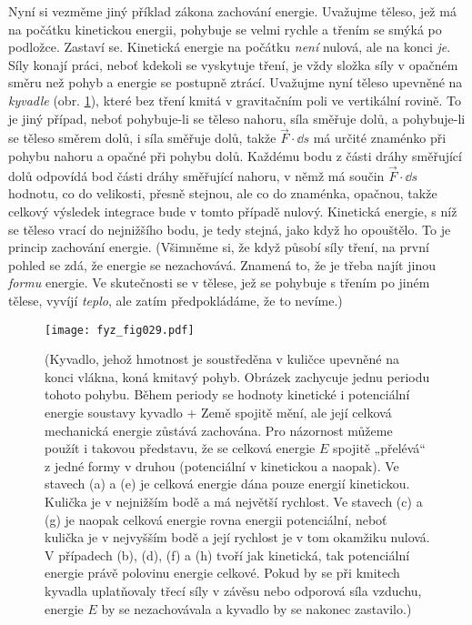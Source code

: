     Nyní si vezměme jiný příklad zákona zachování energie. Uvažujme těleso, jež má na počátku 
    kinetickou energii, pohybuje se velmi rychle a třením se smýká po podložce. Zastaví se. 
    Kinetická energie na počátku \emph{není} nulová, ale na konci \emph{je}. Síly konají práci, 
    neboť kdekoli se vyskytuje tření, je vždy složka síly v opačném směru než pohyb a energie se 
    postupně ztrácí. Uvažujme nyní těleso upevněné na \emph{kyvadle} (obr. \ref{fyz:fig029}), které 
    bez tření kmitá v gravitačním poli ve vertikální rovině. To je jiný případ, neboť pohybuje-li 
    se těleso nahoru, síla směřuje dolů, a pohybuje-li se těleso směrem dolů, i síla směřuje dolů, 
    takže \(\vec{F}\cdot\dd{s}\) má určité znaménko při pohybu nahoru a opačné při pohybu dolů. 
    Každému bodu z části dráhy směřující dolů odpovídá bod části dráhy směřující nahoru, v němž má 
    součin \(\vec{F}\cdot\dd{s}\) hodnotu, co do velikosti, přesně stejnou, ale co do znaménka, 
    opačnou, takže celkový výsledek integrace bude v tomto případě nulový. Kinetická energie, s níž 
    se těleso vrací do nejnižšího bodu, je tedy stejná, jako když ho opouštělo. To je princip 
    zachování energie. (Všimněme si, že když působí síly tření, na první pohled se zdá, že energie 
    se nezachovává. Znamená to, že je třeba najít jinou \emph{formu} energie. Ve skutečnosti se v 
    tělese, jež se pohybuje s třením po jiném tělese, vyvíjí \emph{teplo}, ale zatím předpokládáme, 
    že to nevíme.)
    \begin{figure}[ht!]  %
      \centering
      \texttt{[image: fyz\_fig029.pdf]}
      \caption{ (Kyvadlo, jehož hmotnost je soustředěna v kuličce upevněné na konci vlákna, koná 
                 kmitavý pohyb. Obrázek zachycuje jednu periodu tohoto pohybu. Během periody se 
                 hodnoty kinetické i potenciální energie soustavy kyvadlo + Země spojitě mění, ale 
                 její celková mechanická energie zůstává zachována. Pro názornost můžeme použít i 
                 takovou představu, že se celková energie \(E\) spojitě „přelévá“ z jedné formy v 
                 druhou (potenciální v kinetickou a naopak). Ve stavech (a) a (e) je celková  
                 energie dána pouze energií kinetickou. Kulička je v nejnižším bodě a má největší 
                 rychlost. Ve stavech (c) a (g) je naopak celková energie rovna energii 
                 potenciální, neboť kulička je v nejvyšším bodě a její rychlost je v tom okamžiku  
                 nulová. V případech (b), (d), (f) a (h) tvoří jak kinetická, tak potenciální    
                 energie právě polovinu energie celkové. Pokud by se při kmitech kyvadla 
                 uplatňovaly třecí síly v závěsu nebo odporová síla vzduchu, energie \(E\) by se 
                 nezachovávala a kyvadlo by se nakonec zastavilo.\cite[s.~177]{Halliday2001})}
      \label{fyz:fig029}
    \end{figure}
    
